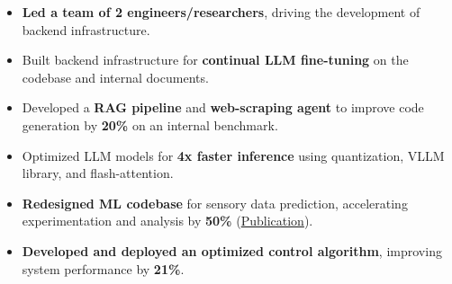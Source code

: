 {
}
\begin{itemize}
    \item \textbf{Led a team of 2 engineers/researchers}, driving the development of backend infrastructure.
    \item Built backend infrastructure for \textbf{continual LLM fine-tuning} on the codebase and internal documents.
    \item Developed a \textbf{RAG pipeline} and \textbf{web-scraping agent} to improve code generation by \textbf{20\%} on an internal benchmark.
    \item Optimized LLM models for \textbf{4x faster inference} using quantization, VLLM library, and flash-attention.
\end{itemize}

{
}
\begin{itemize}
    \item \textbf{Redesigned ML codebase} for sensory data prediction, accelerating experimentation and analysis by \textbf{50\%} (\href{https://link.springer.com/article/10.1007/s10994-023-06413-x}{Publication}).
    \item \textbf{Developed and deployed an optimized control algorithm}, improving system performance by \textbf{21\%}.
\end{itemize}

{
}

